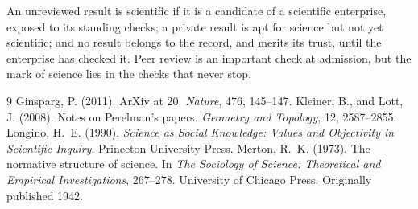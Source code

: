 \documentclass{situationist-preprint}
\begin{document}
An unreviewed result is scientific if it is a candidate of a scientific enterprise, exposed to its standing checks; a private result is apt for science but not yet scientific; and no result belongs to the record, and merits its trust, until the enterprise has checked it. Peer review is an important check at admission, but the mark of science lies in the checks that never stop.

\begin{thebibliography}{9}
 Ginsparg, P. (2011). ArXiv at 20. \emph{Nature}, 476, 145--147.
 Kleiner, B., and Lott, J. (2008). Notes on Perelman's papers. \emph{Geometry and Topology}, 12, 2587--2855.
 Longino, H.~E. (1990). \emph{Science as Social Knowledge: Values and Objectivity in Scientific Inquiry}. Princeton University Press.
 Merton, R.~K. (1973). The normative structure of science. In \emph{The Sociology of Science: Theoretical and Empirical Investigations}, 267--278. University of Chicago Press. Originally published 1942.
\end{thebibliography}
\end{document}

